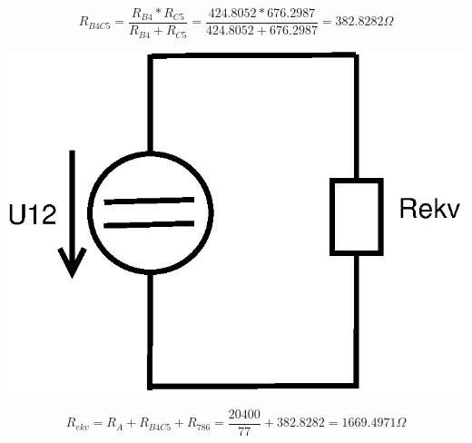\documentclass[a4paper, 12pt]{article}
\begin{document}
$$ R_{B4C5} = \frac{R_{B4} * R_{C5}}{R_{B4} + R_{C5}} = \frac{424.8052 * 676.2987}{424.8052 + 676.2987} = 382.8282 \Omega $$
\vspace{1mm}

\includegraphics[scale=0.4]{pr1/Diagram5.eps}

$$ R_{ekv} = R_A + R_{B4C5} + R_{786} = \frac{20400}{77} + 382.8282 = 1669.4971 \Omega $$
\vspace{3mm}
\end{document}
